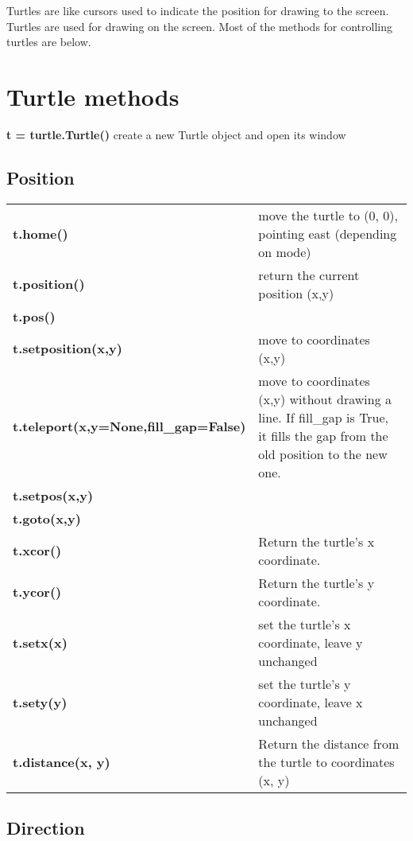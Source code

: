 \documentclass{article}
\begin{document}
Turtles are like cursors used to indicate the position for drawing to the screen. Turtles are used for drawing on the screen. Most of the methods for controlling turtles are below.

\section*{Turtle methods}

\textbf{t = turtle.Turtle()} create a new Turtle object and open its window

\subsection*{Position}

\begin{tabular}{p{}p{}}
\textbf{t.home()} & move the turtle to (0, 0), pointing east (depending on mode) \\
\textbf{t.position()} & return the current position (x,y) \\
\textbf{t.pos()} & \\
\textbf{t.setposition(x,y)}& move to coordinates (x,y) \\
\textbf{t.teleport(x,y=None,fill\_gap=False)} & move to coordinates (x,y) without drawing a line. If fill\_gap is True, it fills the gap from the old position to the new one. \\
\textbf{t.setpos(x,y)} & \\ 
\textbf{t.goto(x,y)}  & \\
\textbf{t.xcor()} & Return the turtle's x coordinate. \\
\textbf{t.ycor()} & Return the turtle's y coordinate. \\
\textbf{t.setx(x)} & set the turtle's x coordinate, leave y unchanged \\
\textbf{t.sety(y)} & set the turtle's y coordinate, leave x unchanged \\
\textbf{t.distance(x, y)} & Return the distance from the turtle to coordinates (x, y) \\
\end{tabular}

\subsection*{Direction}
\end{document}
